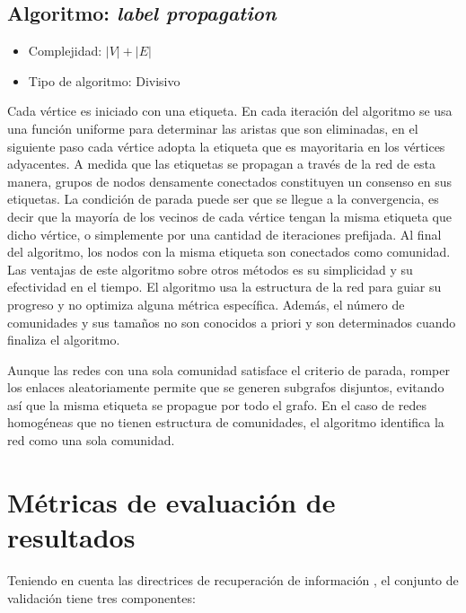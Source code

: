 \subsection{Algoritmo: \textit{label propagation}}\cite{Raghavan2007NearNetworks.}
\begin{itemize}
\item Complejidad: $|V| + |E|$
\item Tipo de algoritmo: Divisivo
\end{itemize}
Cada vértice es iniciado con una etiqueta. En cada iteración del algoritmo se usa una función uniforme para determinar las aristas que son eliminadas, en el siguiente paso cada vértice adopta la etiqueta que es mayoritaria en los vértices adyacentes. A medida que las etiquetas se propagan a través de la red de esta manera, grupos de nodos densamente conectados constituyen un consenso en sus etiquetas. La condición de parada puede ser que se llegue a la convergencia, es decir que la mayoría de los vecinos de cada vértice tengan la misma etiqueta que dicho vértice, o simplemente por una cantidad de iteraciones prefijada. Al final del algoritmo, los nodos con la misma etiqueta son conectados como comunidad. Las ventajas de este algoritmo sobre otros métodos es su simplicidad y su efectividad en el tiempo. El algoritmo usa la estructura de la red para guiar su progreso y no optimiza alguna métrica específica. Además, el número de comunidades y sus tamaños no son conocidos a priori y son determinados cuando finaliza el algoritmo.
 
Aunque las redes con una sola comunidad satisface el criterio de parada, romper los enlaces aleatoriamente permite que se generen subgrafos disjuntos, evitando así que la misma etiqueta se propague por todo el grafo. En el caso de redes homogéneas que no tienen estructura de comunidades, el algoritmo identifica la red como una sola comunidad.

\section{Métricas de evaluación de resultados}
Teniendo en cuenta las directrices de recuperación de información \cite{Manning2008IntroductionRetrieval,Hersh1994OHSUMED:Research}, el conjunto de validación tiene tres componentes: 

